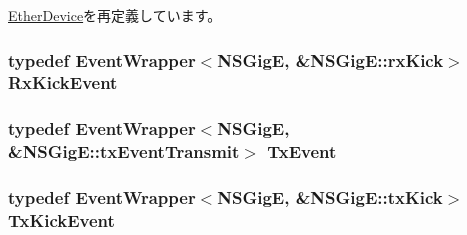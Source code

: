 \hyperlink{classEtherDevice_afcf43c7944288000e850f783bdd66b9d}{EtherDevice}を再定義しています。\hypertarget{classNSGigE_a0a3db9762c2f631ffb1611b087cd169d}{
\subsubsection[{RxKickEvent}]{\setlength{\rightskip}{0pt plus 5cm}typedef {\bf EventWrapper}$<${\bf NSGigE}, \&NSGigE::rxKick$>$ {\bf RxKickEvent}}}
\label{classNSGigE_a0a3db9762c2f631ffb1611b087cd169d}
\hypertarget{classNSGigE_a46cfd25d3b5e1c5aed9e237df531a5ff}{
\subsubsection[{TxEvent}]{\setlength{\rightskip}{0pt plus 5cm}typedef {\bf EventWrapper}$<${\bf NSGigE}, \&NSGigE::txEventTransmit$>$ {\bf TxEvent}}}
\label{classNSGigE_a46cfd25d3b5e1c5aed9e237df531a5ff}
\hypertarget{classNSGigE_ab315242c8bda6591956e9398694d56b8}{
\subsubsection[{TxKickEvent}]{\setlength{\rightskip}{0pt plus 5cm}typedef {\bf EventWrapper}$<${\bf NSGigE}, \&NSGigE::txKick$>$ {\bf TxKickEvent}}}
\label{classNSGigE_ab315242c8bda6591956e9398694d56b8}


